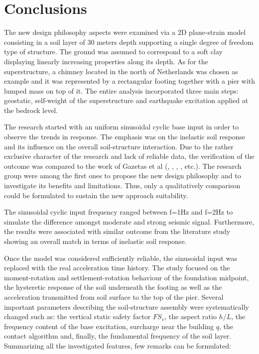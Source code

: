 \newpage
\section{Conclusions}
The new design philosophy aspects were examined via a 2D plane-strain model consisting in a soil layer of 30 meters depth supporting a single degree of freedom type of structure. The ground was assumed to correspond to a soft clay displaying linearly increasing properties along its depth. As for the superstructure, a chimney located in the north of Netherlands was chosen as example and it was represented by a rectangular footing together with a pier with lumped mass on top of it. The entire analysis incorporated three main steps: geostatic, self-weight of the superstructure and earthquake excitation applied at the bedrock level. 

The research started with an uniform sinusoidal cyclic base input in order to observe the trends in response. The emphasis was on the inelastic soil response and its influence on the overall soil-structure interaction. Due to the rather exclusive character of the research and lack of reliable data, the verification of the outcome was compared to the work of Gazetas et al (\cite{gazetas2004nonlinear}, \cite{anastasopoulos2010soil}, \cite{anastasopoulos2014simplified}, \cite{drosos2012soil}, etc.). The research group were among the first ones to propose the new design philosophy and to investigate its benefits and limitations. Thus, only a qualitatively comparison could be formulated to sustain the new approach suitability.

The sinusoidal cyclic input frequency ranged between f=1Hz and f=2Hz to simulate the difference amongst moderate and strong seismic signal. Furthermore, the results were associated with similar outcome from the literature study showing an overall match in terms of inelastic soil response.

Once the model was considered sufficiently reliable, the sinusoidal input was replaced with the real acceleration time history. The study focused on the moment-rotation and settlement-rotation behaviour of the foundation midpoint, the hysteretic response of the soil underneath the footing as well as the acceleration transmitted from soil surface to the top of the pier. Several important parameters describing the soil-structure assembly were systematically changed such as: the vertical static safety factor $FS_v$, the aspect ratio $h/L$, the frequency content of the base excitation, surcharge near the building $q$, the contact algorithm and, finally, the fundamental frequency of the soil layer. Summarizing all the investigated features, few remarks can be formulated:

